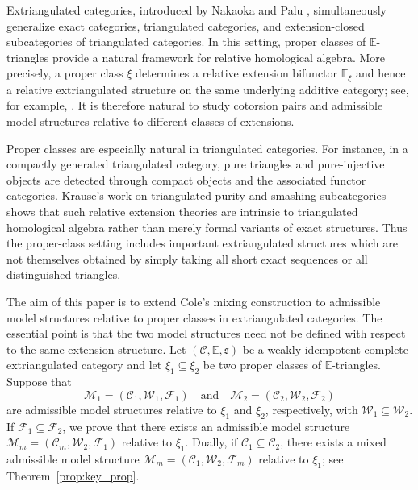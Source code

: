 \documentclass[11pt,a4paper]{amsart}
\numberwithin{equation}{section}
\theoremstyle{plain}
\begin{document}
Extriangulated categories, introduced by Nakaoka and Palu \cite{NP},
simultaneously generalize exact categories, triangulated categories, and
extension-closed subcategories of triangulated categories. In this setting,
proper classes of $\mathbb{E}$-triangles provide a natural framework for
relative homological algebra. More precisely, a proper class $\xi$
determines a relative extension bifunctor $\mathbb{E}_{\xi}$ and hence a
relative extriangulated structure on the same underlying additive category;
see, for example, \cite{hu2020proper}. It is therefore natural to study
cotorsion pairs and admissible model structures relative to different
classes of extensions.

Proper classes are especially natural in triangulated categories. For
instance, in a compactly generated triangulated category, pure triangles
and pure-injective objects are detected through compact objects and the
associated functor categories. Krause's work on triangulated purity and
smashing subcategories \cite{KrauseSmashing,KrauseCoherent} shows that such
relative extension theories are intrinsic to triangulated homological
algebra rather than merely formal variants of exact structures. Thus the
proper-class setting includes important extriangulated structures which are
not themselves obtained by simply taking all short exact sequences or all
distinguished triangles.

The aim of this paper is to extend Cole's mixing construction to admissible
model structures relative to proper classes in extriangulated categories.
The essential point is that the two model structures need not be defined
with respect to the same extension structure. Let
$(\mathscr{C},\mathbb{E},\mathfrak{s})$ be a weakly idempotent complete
extriangulated category and let
$
\xi_1\subseteq\xi_2
$
be two proper classes of $\mathbb{E}$-triangles. Suppose that
\[
\mathcal{M}_1=(\mathcal{C}_1,\mathcal{W}_1,\mathcal{F}_1)
\quad\text{and}\quad
\mathcal{M}_2=(\mathcal{C}_2,\mathcal{W}_2,\mathcal{F}_2)
\]
are admissible model structures relative to $\xi_1$ and $\xi_2$,
respectively, with $\mathcal{W}_1\subseteq\mathcal{W}_2$. If
$\mathcal{F}_1\subseteq\mathcal{F}_2$, we prove that there exists an
admissible model structure
$
\mathcal{M}_m=(\mathcal{C}_m,\mathcal{W}_2,\mathcal{F}_1)
$
relative to $\xi_1$. Dually, if $\mathcal{C}_1\subseteq\mathcal{C}_2$,
there exists a mixed admissible model structure
$
\mathcal{M}_m=(\mathcal{C}_1,\mathcal{W}_2,\mathcal{F}_m)
$
relative to $\xi_1$; see Theorem~\ref{prop:key_prop}.
\end{document}
